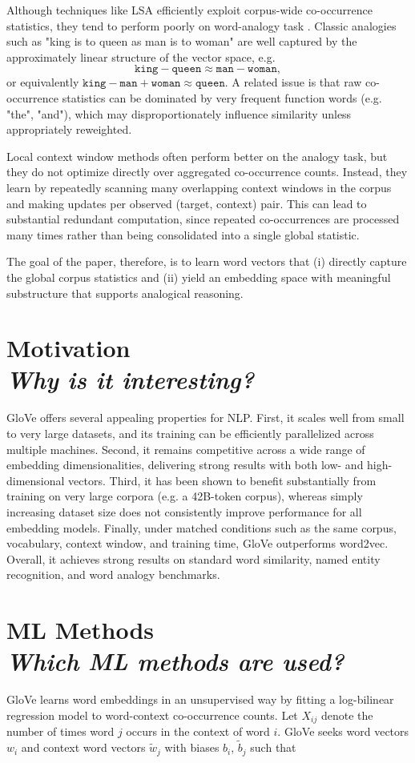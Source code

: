 \documentclass[10pt,a4paper]{article}
\begin{document}
Although techniques like LSA efficiently exploit corpus-wide co-occurrence statistics, they tend to perform poorly on word-analogy task \cite{mikolov2013linguistic}. Classic analogies such as "king is to queen as man is to woman" are well captured by the approximately linear structure of the vector space, e.g.
\[
\texttt{king} - \texttt{queen} \approx \texttt{man} - \texttt{woman},
\]
or equivalently \(\texttt{king} - \texttt{man} + \texttt{woman} \approx \texttt{queen}\). A related issue is that raw co-occurrence statistics can be dominated by very frequent function words (e.g. "the", "and"), which may disproportionately influence similarity unless appropriately reweighted.

Local context window methods often perform better on the analogy task, but they do not optimize directly over aggregated co-occurrence counts. Instead, they learn by repeatedly scanning many overlapping context windows in the corpus and making updates per observed (target, context) pair. This can lead to substantial redundant computation, since repeated co-occurrences are processed many times rather than being consolidated into a single global statistic.

The goal of the paper, therefore, is to learn word vectors that (i) directly capture the global corpus statistics and (ii) yield an embedding space with meaningful substructure that supports analogical reasoning.

\section{\textbf{Motivation} \\ \textit{Why is it interesting?}}
 GloVe offers several appealing properties for NLP. First, it scales well from small to very large datasets, and its training can be efficiently parallelized across multiple machines. Second, it remains competitive across a wide range of embedding dimensionalities, delivering strong results with both low- and high-dimensional vectors. Third, it has been shown to benefit substantially from training on very large corpora (e.g. a 42B-token corpus), whereas simply increasing dataset size does not consistently improve performance for all embedding models. Finally, under matched conditions such as the same corpus, vocabulary, context window, and training time, GloVe outperforms word2vec. Overall, it achieves strong results on standard word similarity, named entity recognition, and word analogy benchmarks.

\section{\textbf{ML Methods} \\ \textit{Which ML methods are used?}}
GloVe learns word embeddings in an unsupervised way by fitting a log-bilinear regression model to word-context co-occurrence counts. Let $X_{ij}$ denote the number of times word $j$ occurs in the context of word $i$. GloVe seeks word vectors $w_i$ and context word vectors $\tilde{w}_j$ with biases $b_i$, $\tilde{b}_j$ such that
\end{document}
